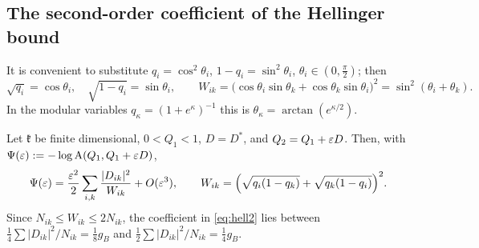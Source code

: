 \documentclass[11pt]{article}
\newcommand{\Hell}{\operatorname{A}}
\theoremstyle{definition}\newtheorem{problem}[theorem]{Problem}
\begin{document}
\subsection{The second-order coefficient of the Hellinger bound}

It is convenient to substitute \(q_i=\cos^2\theta_i\), \(1-q_i=\sin^2\theta_i\),
\(\theta_i\in(0,\tfrac\pi2)\); then
\begin{equation}\label{eq:theta}
 \sqrt{q_i}=\cos\theta_i,\quad\sqrt{1-q_i}=\sin\theta_i,\qquad
 W_{ik}=\bigl(\cos\theta_i\sin\theta_k+\cos\theta_k\sin\theta_i\bigr)^2=\sin^2(\theta_i+\theta_k).
\end{equation}
In the modular variables \(q_\kappa=(1+e^\kappa)^{-1}\) this is \(\theta_\kappa=\arctan(e^{\kappa/2})\).

\begin{proposition}\label{prop:hell2}
Let \(\mathfrak k\) be finite dimensional, \(0<Q_1<1\), \(D=D^*\), and \(Q_2=Q_1+\varepsilon D\).  Then, with
\(\Psi(\eps):=-\log\Hell(Q_1,Q_1+\eps D)\),
\begin{equation}\label{eq:hell2}
 \Psi(\varepsilon)=\frac{\varepsilon^2}{2}\sum_{i,k}\frac{|D_{ik}|^2}{W_{ik}}+O(\varepsilon^3),
 \qquad W_{ik}=\Bigl(\sqrt{q_i(1-q_k)}+\sqrt{q_k(1-q_i)}\Bigr)^2 .
\end{equation}
Since \(N_{ik}\le W_{ik}\le2N_{ik}\), the coefficient in \eqref{eq:hell2} lies between
\(\frac14\sum|D_{ik}|^2/N_{ik}=\frac18g_B\) and \(\frac12\sum|D_{ik}|^2/N_{ik}=\frac14g_B\).
\end{proposition}
\end{document}
